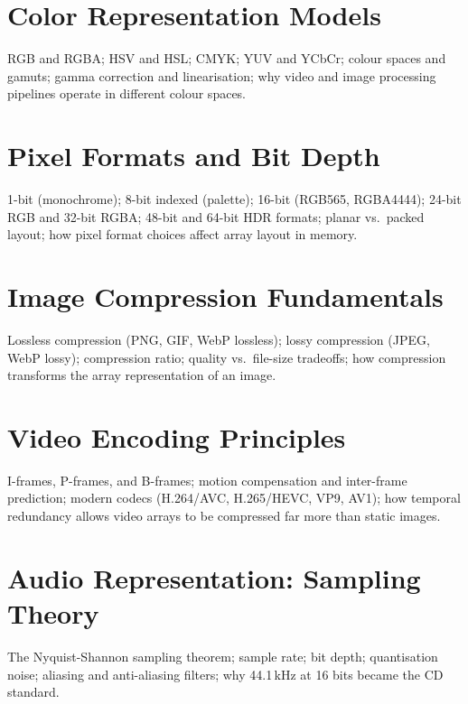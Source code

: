 
\chapter{Color Representation Models}
\label{ch:color-models}

RGB and RGBA; HSV and HSL; CMYK; YUV and YCbCr; colour spaces and gamuts;
gamma correction and linearisation; why video and image processing pipelines
operate in different colour spaces.

\chapter{Pixel Formats and Bit Depth}
\label{ch:pixel-formats}

1-bit (monochrome); 8-bit indexed (palette); 16-bit (RGB565, RGBA4444);
24-bit RGB and 32-bit RGBA; 48-bit and 64-bit HDR formats; planar vs.\
packed layout; how pixel format choices affect array layout in memory.

\chapter{Image Compression Fundamentals}
\label{ch:image-compression}

Lossless compression (PNG, GIF, WebP lossless); lossy compression (JPEG,
WebP lossy); compression ratio; quality vs.\ file-size tradeoffs; how
compression transforms the array representation of an image.

\chapter{Video Encoding Principles}
\label{ch:video-encoding}

I-frames, P-frames, and B-frames; motion compensation and inter-frame
prediction; modern codecs (H.264/AVC, H.265/HEVC, VP9, AV1); how temporal
redundancy allows video arrays to be compressed far more than static images.

\chapter{Audio Representation: Sampling Theory}
\label{ch:audio-sampling}

The Nyquist-Shannon sampling theorem; sample rate; bit depth; quantisation
noise; aliasing and anti-aliasing filters; why 44.1\,kHz at 16 bits became
the CD standard.

